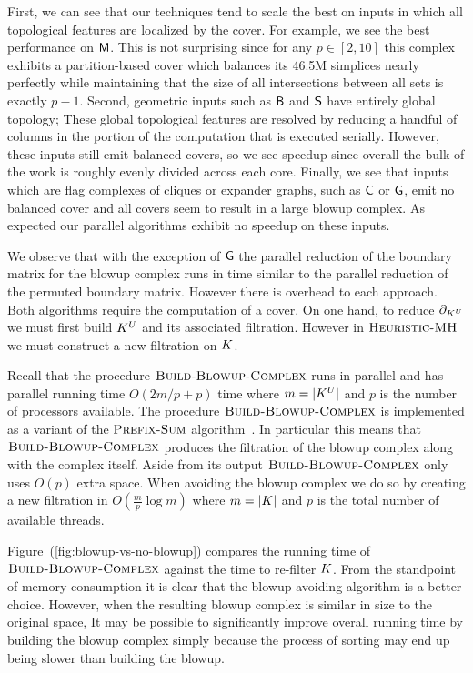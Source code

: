 \documentclass{elsarticle}
\begin{document}
First, we can see that our techniques tend to scale the best on inputs
in which all topological features are localized by the cover. For example, we see the
best performance on $\textsf{M}$. This is not surprising since for any $p \in [2, 10]$ 
this complex exhibits a partition-based cover which balances its 
46.5M simplices nearly perfectly while maintaining that the size of all intersections between all sets is exactly $p-1$.
Second, geometric inputs such as ${\textsf{B}}$ and $\textsf{S}$ have entirely global topology; These
global topological features are resolved by reducing a handful of columns in the portion of the computation that is 
executed serially. However, these inputs still emit balanced covers, so we see speedup since 
overall the bulk of the work is roughly evenly divided across each core.
Finally, we see that inputs which are flag complexes of cliques or expander graphs, 
such as $\textsf{C}$ or $\textsf{G}$, emit no balanced cover and all covers seem to result in a large blowup complex. 
As expected our parallel algorithms exhibit no speedup on these inputs. 


We observe that with the exception of $\textsf{G}$ the parallel reduction of the boundary matrix for the blowup complex 
runs in time similar to the parallel reduction of the permuted boundary matrix. However there is overhead to each approach. 
Both algorithms require the computation of a cover. On one hand, to reduce $\partial_{K^U}$ we must first build $K^U$ and its associated filtration. 
However in $\textnormal{\scshape Heuristic-MH}$ we must construct a new filtration on $K$. 

Recall that the procedure $\textnormal{\scshape Build-Blowup-Complex}$ runs in parallel and has parallel running time $O(2m/p + p)$ time where $m = |K^{U}|$ 
and $p$ is the number of processors available. 
The procedure $\textnormal{\scshape Build-Blowup-Complex}$ is implemented as a variant of the $\textnormal{\scshape Prefix-Sum}$ algorithm~\cite{breshears}. 
In particular this means that $\textnormal{\scshape Build-Blowup-Complex}$ produces the filtration of the blowup complex along with the complex itself. 
Aside from its output $\textnormal{\scshape Build-Blowup-Complex}$ only uses $O(p)$ extra space. When avoiding the blowup complex we 
do so by creating a new filtration in $O(\frac{m}{p}\log{m})$ where $m = |K|$ and $p$ is the total number of available threads.

Figure~(\ref{fig:blowup-vs-no-blowup}) compares the running time of $\textnormal{\scshape Build-Blowup-Complex}$ against the time to re-filter $K$.
From the standpoint of memory consumption it is clear that the blowup avoiding algorithm is a better choice. However,
when the resulting blowup complex is similar in size to the original space, It may be possible to significantly improve overall running time 
by building the blowup complex simply because the process of sorting may end up being slower than building the blowup.
\end{document}
